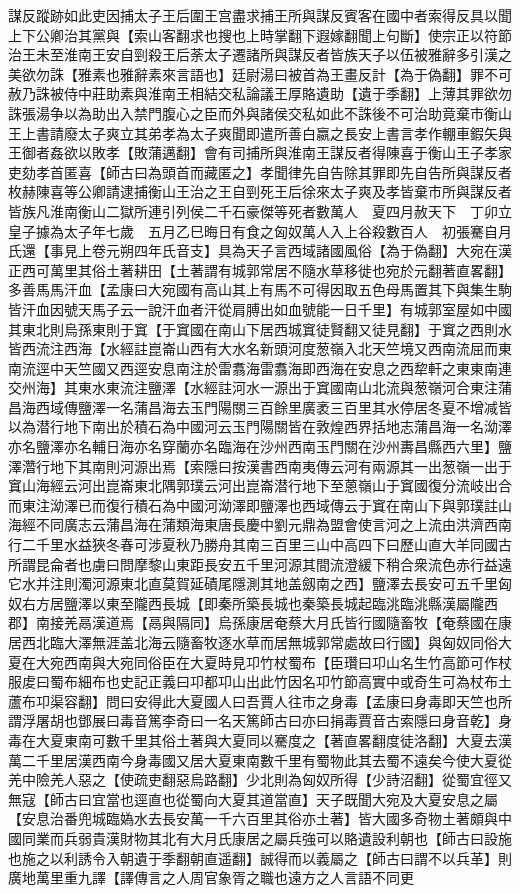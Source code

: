謀反蹤跡如此吏因捕太子王后圍王宫盡求捕王所與謀反賓客在國中者索得反具以聞上下公卿治其黨與【索山客翻求也搜也上時掌翻下遐嫁翻聞上句斷】使宗正以符節治王未至淮南王安自剄殺王后荼太子遷諸所與謀反者皆族天子以伍被雅辭多引漢之美欲勿誅【雅素也雅辭素來言語也】廷尉湯曰被首為王畫反計【為于偽翻】罪不可赦乃誅被侍中莊助素與淮南王相結交私論議王厚賂遺助【遺于季翻】上薄其罪欲勿誅張湯争以為助出入禁門腹心之臣而外與諸侯交私如此不誅後不可治助竟棄市衡山王上書請廢太子爽立其弟孝為太子爽聞即遣所善白嬴之長安上書言孝作輣車鍜矢與王御者姦欲以敗孝【敗蒲邁翻】會有司捕所與淮南王謀反者得陳喜于衡山王子孝家吏劾孝首匿喜【師古曰為頭首而藏匿之】孝聞律先自告除其罪即先自告所與謀反者枚赫陳喜等公卿請逮捕衡山王治之王自剄死王后徐來太子爽及孝皆棄市所與謀反者皆族凡淮南衡山二獄所連引列侯二千石豪傑等死者數萬人　夏四月赦天下　丁卯立皇子據為太子年七歲　五月乙巳晦日有食之匈奴萬人入上谷殺數百人　初張騫自月氏還【事見上卷元朔四年氏音支】具為天子言西域諸國風俗【為于偽翻】大宛在漢正西可萬里其俗土著耕田【土著謂有城郭常居不隨水草移徙也宛於元翻著直畧翻】多善馬馬汗血【孟康曰大宛國有高山其上有馬不可得因取五色母馬置其下與集生駒皆汗血因號天馬子云一說汗血者汗從肩膊出如血號能一日千里】有城郭室屋如中國其東北則烏孫東則于窴【于窴國在南山下居西城窴徒賢翻又徒見翻】于窴之西則水皆西流注西海【水經註崑崙山西有大水名新頭河度葱嶺入北天竺境又西南流屈而東南流逕中天竺國又西逕安息南注於雷翥海雷翥海即西海在安息之西犂軒之東東南連交州海】其東水東流注鹽澤【水經註河水一源出于窴國南山北流與葱嶺河合東注蒲昌海西域傳鹽澤一名蒲昌海去玉門陽關三百餘里廣袤三百里其水停居冬夏不增减皆以為潜行地下南出於積石為中國河云玉門陽關皆在敦煌西界括地志蒲昌海一名泑澤亦名鹽澤亦名輔日海亦名穿蘭亦名臨海在沙州西南玉門關在沙州夀昌縣西六里】鹽澤濳行地下其南則河源出焉【索隱曰按漢書西南夷傳云河有兩源其一出葱嶺一出于窴山海經云河出崑崙東北隅郭璞云河出崑崙潜行地下至蒽嶺山于窴國復分流岐出合而東注泑澤已而復行積石為中國河泑澤即鹽澤也西域傳云于窴在南山下與郭璞註山海經不同廣志云蒲昌海在蒲類海東唐長慶中劉元鼎為盟會使言河之上流由洪濟西南行二千里水益狹冬春可涉夏秋乃勝舟其南三百里三山中高四下曰歷山直大羊同國古所謂昆侖者也虜曰問摩黎山東距長安五千里河源其間流澄緩下稍合衆流色赤行益遠它水并注則濁河源東北直莫賀延磧尾隱測其地盖劔南之西】鹽澤去長安可五千里匈奴右方居鹽澤以東至隴西長城【即秦所築長城也秦築長城起臨洮臨洮縣漢屬隴西郡】南接羌鬲漢道焉【鬲與隔同】烏孫康居奄蔡大月氏皆行國隨畜牧【奄蔡國在康居西北臨大澤無涯盖北海云隨畜牧逐水草而居無城郭常處故曰行國】與匈奴同俗大夏在大宛西南與大宛同俗臣在大夏時見卭竹杖蜀布【臣瓚曰卭山名生竹高節可作杖服䖍曰蜀布細布也史記正義曰卭都卭山出此竹因名卭竹節高實中或奇生可為杖布土蘆布卭渠容翻】問曰安得此大夏國人曰吾賈人往市之身毒【孟康曰身毒即天竺也所謂浮屠胡也鄧展曰毒音篤李奇曰一名天篤師古曰亦曰捐毒賈音古索隱曰身音乾】身毒在大夏東南可數千里其俗土著與大夏同以騫度之【著直畧翻度徒洛翻】大夏去漢萬二千里居漢西南今身毒國又居大夏東南數千里有蜀物此其去蜀不遠矣今使大夏從羌中險羌人惡之【使疏吏翻惡烏路翻】少北則為匈奴所得【少詩沼翻】從蜀宜徑又無寇【師古曰宜當也逕直也從蜀向大夏其道當直】天子既聞大宛及大夏安息之屬【安息治番兜城臨媯水去長安萬一千六百里其俗亦土著】皆大國多奇物土著頗與中國同業而兵弱貴漢財物其北有大月氏康居之屬兵強可以賂遺設利朝也【師古曰設施也施之以利誘令入朝遺于季翻朝直遥翻】誠得而以義屬之【師古曰謂不以兵革】則廣地萬里重九譯【譯傳言之人周官象胥之職也遠方之人言語不同更